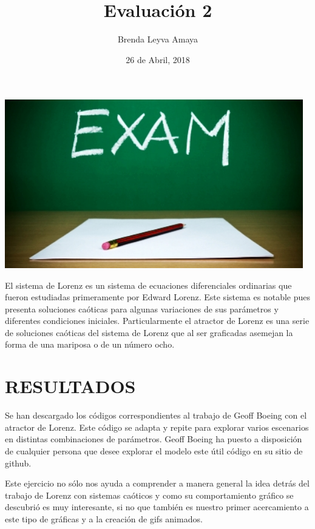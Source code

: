 \documentclass{article} %
\title{Evaluación 2}
\author{Brenda Leyva Amaya}
\date{26 de Abril, 2018}
\begin{document}
\maketitle 

\begin{center}

	\includegraphics[width=13cm]{exam.jpg}
       
\end{center}

\vspace{7.0 cm}

El sistema de Lorenz es un sistema de ecuaciones diferenciales ordinarias que fueron estudiadas primeramente por Edward Lorenz. Este sistema es notable pues presenta soluciones caóticas para algunas variaciones de sus parámetros y diferentes condiciones iniciales. Particularmente el atractor de Lorenz es una serie de soluciones caóticas del sistema de Lorenz que al ser graficadas asemejan la forma de una mariposa o de un número ocho. 

\section*{RESULTADOS}

Se han descargado los códigos correspondientes al trabajo de Geoff Boeing con el atractor de Lorenz. Este código se adapta y repite para explorar varios escenarios en distintas combinaciones de parámetros. Geoff Boeing ha puesto a disposición de cualquier persona que desee explorar el modelo este útil código en su sitio de github. 

\vspace{0.5 cm}

Este ejercicio no sólo nos ayuda a comprender a manera general la idea detrás del trabajo de Lorenz con sistemas caóticos y como su comportamiento gráfico se descubrió es muy interesante, si no que también es nuestro primer acercamiento a este tipo de gráficas y a la creación de gifs animados. 
\end{document}
